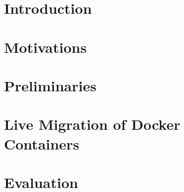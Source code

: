 \documentclass[sigconf]{acmart}
\begin{document}


\begin{abstract}

\end{abstract}





\maketitle

% 

\section{Introduction}


\section{Motivations}



% 

\section{Preliminaries}



\section{Live Migration of Docker Containers}




% 

\section{Evaluation}
\end{document}

